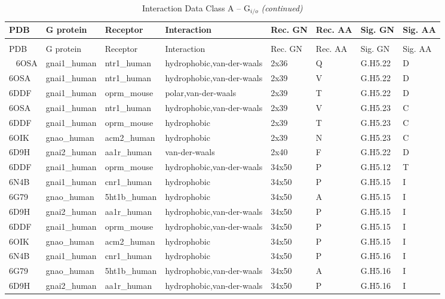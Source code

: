 
\begin{landscape}
\begin{longtable}{llllllll}
\caption{\label{tab:interaction-data-a-gio}Interaction Data Class A – G$_{i/o}$}\\
\toprule
PDB & G protein & Receptor & Interaction & Rec. GN & Rec. AA & Sig. GN & Sig. AA\\
\midrule
\endfirsthead
\caption[]{Interaction Data Class A – G$_{i/o}$ \textit{(continued)}}\\
\toprule
PDB & G protein & Receptor & Interaction & Rec. GN & Rec. AA & Sig. GN & Sig. AA\\
\midrule
\endhead
\
\endfoot
\bottomrule
\endlastfoot
6OSA & gnai1\_human & ntr1\_human & hydrophobic,van-der-waals & 2x36 & Q & G.H5.22 & D\\
6OSA & gnai1\_human & ntr1\_human & hydrophobic,van-der-waals & 2x39 & V & G.H5.22 & D\\
6DDF & gnai1\_human & oprm\_mouse & polar,van-der-waals & 2x39 & T & G.H5.22 & D\\
6OSA & gnai1\_human & ntr1\_human & hydrophobic,van-der-waals & 2x39 & V & G.H5.23 & C\\
6DDF & gnai1\_human & oprm\_mouse & hydrophobic & 2x39 & T & G.H5.23 & C\\
\addlinespace
6OIK & gnao\_human & acm2\_human & hydrophobic & 2x39 & N & G.H5.23 & C\\
6D9H & gnai2\_human & aa1r\_human & van-der-waals & 2x40 & F & G.H5.22 & D\\
6DDF & gnai1\_human & oprm\_mouse & hydrophobic,van-der-waals & 34x50 & P & G.H5.12 & T\\
6N4B & gnai1\_human & cnr1\_human & hydrophobic & 34x50 & P & G.H5.15 & I\\
6G79 & gnao\_human & 5ht1b\_human & hydrophobic & 34x50 & A & G.H5.15 & I\\
\addlinespace
6D9H & gnai2\_human & aa1r\_human & hydrophobic,van-der-waals & 34x50 & P & G.H5.15 & I\\
6DDF & gnai1\_human & oprm\_mouse & hydrophobic,van-der-waals & 34x50 & P & G.H5.15 & I\\
6OIK & gnao\_human & acm2\_human & hydrophobic & 34x50 & P & G.H5.15 & I\\
6N4B & gnai1\_human & cnr1\_human & hydrophobic & 34x50 & P & G.H5.16 & I\\
6G79 & gnao\_human & 5ht1b\_human & hydrophobic,van-der-waals & 34x50 & A & G.H5.16 & I\\
\addlinespace
6D9H & gnai2\_human & aa1r\_human & hydrophobic,van-der-waals & 34x50 & P & G.H5.16 & I\\

\end{longtable}
\end{landscape}
